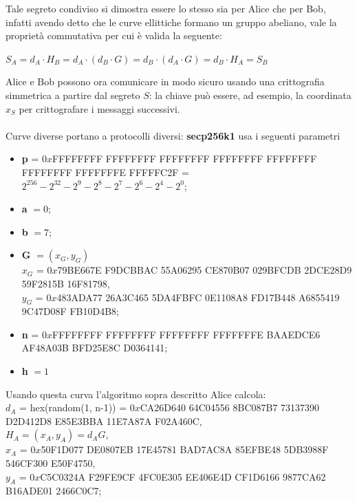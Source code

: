 \documentclass[a4paper,12pt]{tesiinfo}
\begin{document}
Tale segreto condiviso si dimostra essere lo stesso sia per Alice che per Bob, infatti avendo detto che le curve ellittiche formano un gruppo abeliano, vale la propriet\`a commutativa per cui \`e valida la seguente:
\begin{center}
  $S_A = d_A \cdot H_B = d_A \cdot (d_B \cdot G) = d_B \cdot (d_A \cdot G) = d_B \cdot H_A = S_B$
\end{center}
Alice e Bob possono ora comunicare in modo sicuro usando una crittografia simmetrica a partire dal segreto $S$: la chiave pu\`o essere, ad esempio, la coordinata $x_S$ per crittografare i messaggi successivi.
\\
\\
Curve diverse portano a protocolli diversi: \textbf{secp256k1} usa i seguenti parametri 
\begin{itemize}
  \item \textbf{p} = $0x$FFFFFFFF FFFFFFFF FFFFFFFF FFFFFFFF FFFFFFFF FFFFFFFF FFFFFFFE FFFFFC2F = $2^{256} - 2^{32}-2^9-2^8-2^7-2^6-2^4-2^0$;
  
  \item \textbf{a} $=0$;
  
  \item \textbf{b} $=7$;
  
  \item \textbf{G} $= (x_G, y_G)$
  \\
  $x_G$ = $0x$79BE667E F9DCBBAC 55A06295 CE870B07 029BFCDB 2DCE28D9 59F2815B 16F81798,
  \\
  $y_G$ = $0x$483ADA77 26A3C465 5DA4FBFC 0E1108A8 FD17B448 A6855419 9C47D08F FB10D4B8;
  
  \item \textbf{n} = $0x$FFFFFFFF FFFFFFFF FFFFFFFF FFFFFFFE BAAEDCE6 AF48A03B BFD25E8C D0364141;
  
  \item \textbf{h} $ = 1$
\end{itemize}
Usando questa curva l'algoritmo sopra descritto Alice calcola:\\
$d_A$ = hex(random(1, n-1)) = $0x$CA26D640 64C04556 8BC087B7 73137390 D2D412D8 E85E3BBA 11E7A87A F02A460C,\\
$H_A = (x_A, y_A) = d_AG$,\\
$x_A$ = $0x$50F1D077 DE0807EB 17E45781 BAD7AC8A 85EFBE48 5DB3988F 546CF300 E50F4750,\\
$y_A$ = $0x$C5C0324A F29FE9CF 4FC0E305 EE406E4D CF1D6166 9877CA62 B16ADE01 2466C0C7;\\
\\
\end{document}
